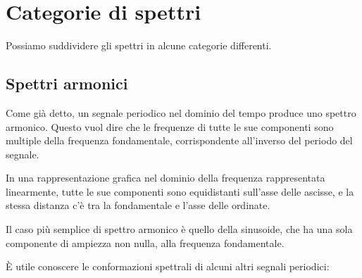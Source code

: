 \section{Categorie di spettri}

Possiamo suddividere gli spettri in alcune categorie differenti. 


\subsection{Spettri armonici}

Come già detto, un segnale periodico nel dominio del tempo produce uno spettro armonico. Questo vuol dire che le frequenze di tutte le sue componenti sono multiple della frequenza fondamentale, corrispondente all'inverso del periodo del segnale.

In una rappresentazione grafica nel dominio della frequenza rappresentata linearmente, tutte le sue componenti sono equidistanti sull'asse delle ascisse, e la stessa distanza c'è tra la fondamentale e l'asse delle ordinate.

Il caso più semplice di spettro armonico è quello della sinusoide, che ha una sola componente di ampiezza non nulla, alla frequenza fondamentale.

È utile conoscere le conformazioni spettrali di alcuni altri segnali periodici:


